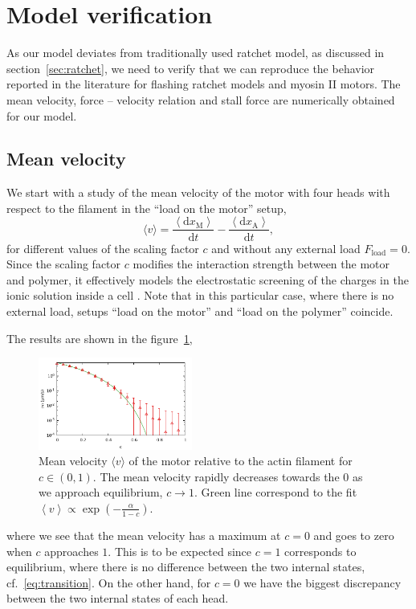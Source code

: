 \documentclass[aps,pre,twocolumn,showpacs,showkeys,superscriptaddress,floatfix]{revtex4-1}
\newcommand{\rmd}{{\mathrm d}}
\begin{document}
\section{Model verification}
\label{sec:model_verification}
As our model deviates from traditionally used ratchet model, as discussed in section~\ref{sec:ratchet},  
we need to verify that we can reproduce the behavior reported in the literature for flashing ratchet models and myosin II motors. 
The mean velocity, force -- velocity relation and stall force are numerically obtained for our model.

\subsection{Mean velocity}
\label{sec:velocity}
We start with a study of the mean velocity of the motor with four heads with respect to the filament in the ``load on the motor'' setup,
\begin{equation}
\langle v \rangle 
= \frac{ \left\langle \rmd x_\text{M} \right\rangle }{ \rmd t } 
- \frac{ \left\langle \rmd x_\text{A} \right\rangle }{ \rmd t } ,
\label{eq:mean_velocity} 
\end{equation}
for different values of the scaling factor $c$ and without any external load $F_\text{load} = 0$.
Since the scaling factor $c$ modifies the interaction strength between the motor and polymer, it effectively models the electrostatic screening of the charges in the ionic solution inside a cell \cite{barterls1993myosin}.
Note that in this particular case, where there is no external load, setups ``load on the motor'' and ``load on the polymer'' coincide. 

The results are shown in the figure~\ref{fig:c_v},
\begin{figure}[t]
\centering
\includegraphics[width=0.45\textwidth,height=!]{c_v_4heads}
\caption{
\label{fig:c_v}
Mean velocity $\langle v \rangle$ of the motor relative to the actin filament for $c \in (0,1)$.
The mean velocity rapidly decreases towards the $0$ as we approach equilibrium, $c \to 1$.  
Green line correspond to the fit $ \left\langle v \right\rangle \propto \exp ( - \frac{\alpha}{1-c} ) $.
} 
\end{figure}
where we see that the mean velocity has a maximum at $c=0$ and goes to zero when $c$ approaches $1$. 
This is to be expected since $c=1$ corresponds to equilibrium, where there is no difference between the two internal states, cf.~\eqref{eq:transition}.
On the other hand, for $c=0$ we have the biggest discrepancy between the two internal states of each head. 
\end{document}
